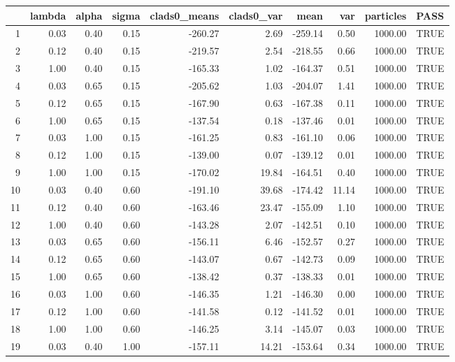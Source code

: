 \begin{table}[ht]
\centering
\begin{tabular}{rrrrrrrrrl}
  \hline
 & lambda & alpha & sigma & clads0\_means & clads0\_var & mean & var & particles & PASS \\ 
  \hline
1 & 0.03 & 0.40 & 0.15 & -260.27 & 2.69 & -259.14 & 0.50 & 1000.00 & TRUE \\ 
  2 & 0.12 & 0.40 & 0.15 & -219.57 & 2.54 & -218.55 & 0.66 & 1000.00 & TRUE \\ 
  3 & 1.00 & 0.40 & 0.15 & -165.33 & 1.02 & -164.37 & 0.51 & 1000.00 & TRUE \\ 
  4 & 0.03 & 0.65 & 0.15 & -205.62 & 1.03 & -204.07 & 1.41 & 1000.00 & TRUE \\ 
  5 & 0.12 & 0.65 & 0.15 & -167.90 & 0.63 & -167.38 & 0.11 & 1000.00 & TRUE \\ 
  6 & 1.00 & 0.65 & 0.15 & -137.54 & 0.18 & -137.46 & 0.01 & 1000.00 & TRUE \\ 
  7 & 0.03 & 1.00 & 0.15 & -161.25 & 0.83 & -161.10 & 0.06 & 1000.00 & TRUE \\ 
  8 & 0.12 & 1.00 & 0.15 & -139.00 & 0.07 & -139.12 & 0.01 & 1000.00 & TRUE \\ 
  9 & 1.00 & 1.00 & 0.15 & -170.02 & 19.84 & -164.51 & 0.40 & 1000.00 & TRUE \\ 
  10 & 0.03 & 0.40 & 0.60 & -191.10 & 39.68 & -174.42 & 11.14 & 1000.00 & TRUE \\ 
  11 & 0.12 & 0.40 & 0.60 & -163.46 & 23.47 & -155.09 & 1.10 & 1000.00 & TRUE \\ 
  12 & 1.00 & 0.40 & 0.60 & -143.28 & 2.07 & -142.51 & 0.10 & 1000.00 & TRUE \\ 
  13 & 0.03 & 0.65 & 0.60 & -156.11 & 6.46 & -152.57 & 0.27 & 1000.00 & TRUE \\ 
  14 & 0.12 & 0.65 & 0.60 & -143.07 & 0.67 & -142.73 & 0.09 & 1000.00 & TRUE \\ 
  15 & 1.00 & 0.65 & 0.60 & -138.42 & 0.37 & -138.33 & 0.01 & 1000.00 & TRUE \\ 
  16 & 0.03 & 1.00 & 0.60 & -146.35 & 1.21 & -146.30 & 0.00 & 1000.00 & TRUE \\ 
  17 & 0.12 & 1.00 & 0.60 & -141.58 & 0.12 & -141.52 & 0.01 & 1000.00 & TRUE \\ 
  18 & 1.00 & 1.00 & 0.60 & -146.25 & 3.14 & -145.07 & 0.03 & 1000.00 & TRUE \\ 
  19 & 0.03 & 0.40 & 1.00 & -157.11 & 14.21 & -153.64 & 0.34 & 1000.00 & TRUE \\ 

\end{tabular}
\end{table}
